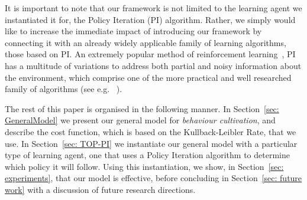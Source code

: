 It is important to note that our framework is not  limited
to the learning agent we instantiated it for, the Policy Iteration
(PI) algorithm. Rather, we simply would like to increase the immediate
impact of introducing our framework by connecting it with an already
widely applicable family of learning algorithms, those based on 
PI. An extremely popular method of reinforcement
learning~\cite{sutton_barto_RL}, PI has a multitude of variations to
address both partial and noisy information about the environment,
which comprise one of the more practical and well researched family of
algorithms (see e.g. ~\cite{koller_parr_2000,
  perkins_precup_2003,vanRoy_98,sato_kobayashi_2000,lagoudakis_parr_2003,sugiyama_et_al_2009}).


The rest of this paper is organised in the following manner. In
Section~\ref{sec: GeneralModel} we present our general model for
\emph{behaviour cultivation}, and describe the cost function, which is
based on the Kullback-Leibler Rate, that we use.  In Section~\ref{sec:
  TOP-PI} we instantiate our general model with a particular type of
learning agent, one that uses a Policy Iteration algorithm to
determine which policy it will follow. Using this instantiation, we
show, in Section~\ref{sec: experiments}, that our model is effective,
before concluding in Section~\ref{sec: future work} with a discussion
of future research directions.



